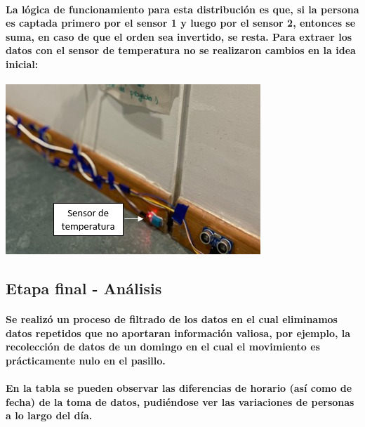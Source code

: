 \documentclass[12pt]{article} %
\newcommand{\normalparagraph}[1]{\paragraph{\textnormal{#1}}}
\begin{document}
\normalparagraph{La lógica de funcionamiento para esta distribución es que, si la persona es captada primero por el sensor 1 y luego por el sensor 2, entonces se suma, en caso de que el orden sea invertido, se resta.
Para extraer los datos con el sensor de temperatura no se realizaron cambios en la idea inicial:}

\begin{center}
\begin{minipage}[c]{0.45\textwidth} %
  \centering
  \includegraphics[width=\linewidth]{Pictures/Sensor temperatura - Colocado.jpg}
  \label{fig:sensor-temperatura}
\end{minipage}
\end{center}



\subsection{Etapa final - Análisis} %
\normalparagraph{Se realizó un proceso de filtrado de los datos en el cual eliminamos datos repetidos que no aportaran información valiosa, por ejemplo, la recolección de datos de un domingo en el cual el movimiento es prácticamente nulo en el pasillo.}

\normalparagraph{En la tabla se pueden observar las diferencias de horario (así como de fecha) de la toma de datos, pudiéndose ver las variaciones de personas a lo largo del día.}
\end{document}
